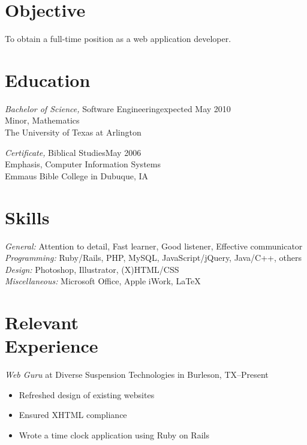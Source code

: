 \documentclass[margin]{res}
\begin{document}
\begin{resume}

\section{\textsf{Objective}} 

                To obtain a full-time position as a web application developer.


\section{\textsf{Education}} 

                {\sl Bachelor of Science,} Software Engineering\dotfill expected May 2010\\
                Minor, Mathematics\\
                The University of Texas at Arlington
                
                {\sl Certificate,} Biblical Studies\dotfill May 2006 \\
                Emphasis, Computer Information Systems\\
                Emmaus Bible College in Dubuque, IA


\section{\textsf{Skills}}

                {\sl General:} Attention to detail, Fast learner, Good listener, Effective communicator  \\
                {\sl Programming:} Ruby/Rails, PHP, MySQL, JavaScript/jQuery, Java/C++, others \\
                {\sl Design:} Photoshop, Illustrator, (X)HTML/CSS \\
                {\sl Miscellaneous:} Microsoft Office, Apple iWork, \LaTeX


\section{\textsf{Relevant \\ Experience}} 
                
                {\sl Web Guru}
                 at Diverse Suspension Technologies in Burleson, TX--Present
                 \begin{itemize} \itemsep -2pt %
                   \item Refreshed design of existing websites
                   \item Ensured XHTML compliance
                   \item Wrote a time clock application using Ruby on Rails
                \end{itemize}
                

\end{resume}
\end{document}
